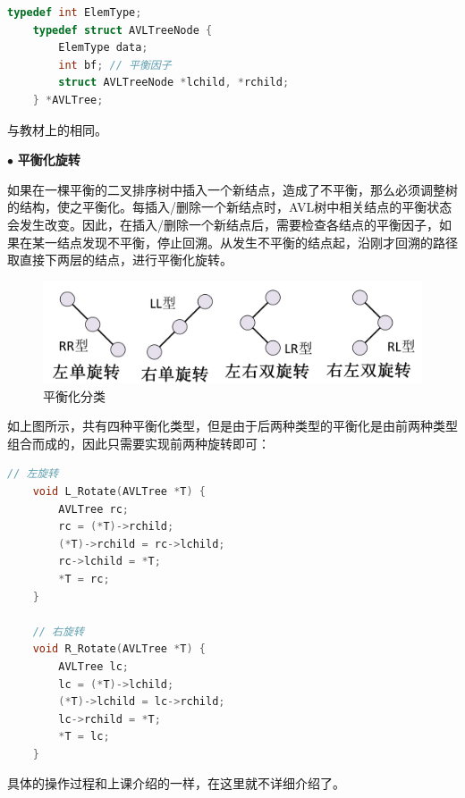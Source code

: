 \begin{lstlisting}[language=C, caption={平衡二叉树数据结构}]
    typedef int ElemType;
    typedef struct AVLTreeNode {
        ElemType data;
        int bf; // 平衡因子
        struct AVLTreeNode *lchild, *rchild;
    } *AVLTree;
\end{lstlisting}

与教材上的相同。

\vspace{1ex}
\noindent
$\bullet$
\textbf{平衡化旋转}

如果在一棵平衡的二叉排序树中插入一个新结点，造成了不平衡，那么必须调整树的结构，使之平衡化。每插入/删除一个新结点时，AVL树中相关结点的平衡状态会发生改变。因此，在插入/删除一个新结点后，需要检查各结点的平衡因子，如果在某一结点发现不平衡，停止回溯。从发生不平衡的结点起，沿刚才回溯的路径取直接下两层的结点，进行平衡化旋转。

\begin{figure}[H]
  \centering
  \includegraphics[width=15cm]{fig/AVLTree3.png}
  \caption{平衡化分类}
\end{figure}

如上图所示，共有四种平衡化类型，但是由于后两种类型的平衡化是由前两种类型组合而成的，因此只需要实现前两种旋转即可：


\begin{lstlisting}[language=C, caption={左单旋转和右单旋转}]
    // 左旋转
    void L_Rotate(AVLTree *T) {
        AVLTree rc;
        rc = (*T)->rchild;
        (*T)->rchild = rc->lchild;
        rc->lchild = *T;
        *T = rc;
    }

    // 右旋转
    void R_Rotate(AVLTree *T) {
        AVLTree lc;
        lc = (*T)->lchild;
        (*T)->lchild = lc->rchild;
        lc->rchild = *T;
        *T = lc;
    }
\end{lstlisting}

具体的操作过程和上课介绍的一样，在这里就不详细介绍了。

